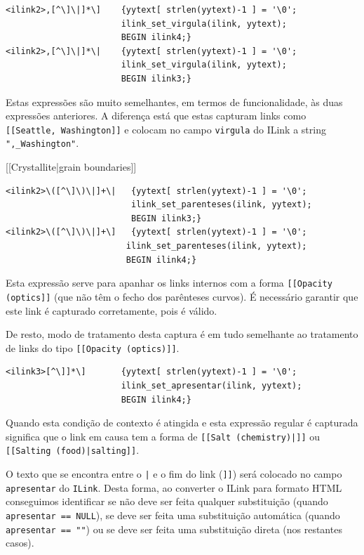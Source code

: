 \documentclass[11pt, a4paper, oneside]{article}
\begin{document}
\begin{verbatim}
<ilink2>,[^\]\|]*\]    {yytext[ strlen(yytext)-1 ] = '\0';
                       ilink_set_virgula(ilink, yytext);
                       BEGIN ilink4;}
<ilink2>,[^\]\|]*\|    {yytext[ strlen(yytext)-1 ] = '\0';
                       ilink_set_virgula(ilink, yytext);
                       BEGIN ilink3;}
\end{verbatim}

Estas expressões são muito semelhantes, em termos de funcionalidade, às duas expressões anteriores. A diferença está que estas capturam links como \texttt{[[Seattle, Washington]]} e colocam no campo \texttt{virgula} do ILink a string \texttt{",\_Washington"}.




[[Crystallite|grain boundaries]]
\begin{verbatim}
<ilink2>\([^\]\)\|]+\|   {yytext[ strlen(yytext)-1 ] = '\0';
                         ilink_set_parenteses(ilink, yytext);
                         BEGIN ilink3;}
<ilink2>\([^\]\)\|]+\]   {yytext[ strlen(yytext)-1 ] = '\0';
                        ilink_set_parenteses(ilink, yytext);
                        BEGIN ilink4;}
\end{verbatim}

Esta expressão serve para apanhar os links internos com a forma \texttt{[[Opacity (optics]]} (que não têm o fecho dos parênteses curvos). É necessário garantir que este link é capturado corretamente, pois é válido.

De resto, modo de tratamento desta captura é em tudo semelhante ao tratamento de links do tipo \texttt{[[Opacity (optics)]]}.



\begin{verbatim}
<ilink3>[^\]]*\]       {yytext[ strlen(yytext)-1 ] = '\0';
                       ilink_set_apresentar(ilink, yytext);
                       BEGIN ilink4;}
\end{verbatim}

Quando esta condição de contexto é atingida e esta expressão regular é capturada significa que o link em causa tem a forma de \texttt{[[Salt (chemistry)|]]} ou \texttt{[[Salting (food)|salting]]}.

O texto que se encontra entre o \texttt{|} e o fim do link (\texttt{]]}) será colocado no campo \texttt{apresentar} do \texttt{ILink}. Desta forma, ao converter o ILink para formato HTML conseguimos identificar se não deve ser feita qualquer substituição (quando \texttt{apresentar == NULL}), se deve ser feita uma substituição automática (quando \texttt{apresentar == ""}) ou se deve ser feita uma substituição direta (nos restantes casos).
\end{document}
